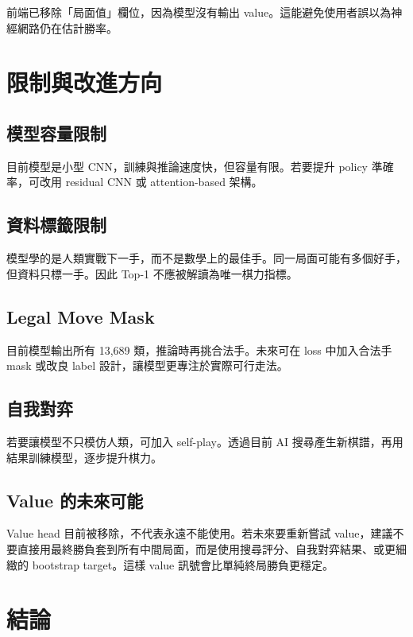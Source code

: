 \documentclass[12pt,a4paper,fontset=none]{ctexart}
\begin{document}
前端已移除「局面值」欄位，因為模型沒有輸出 value。這能避免使用者誤以為神經網路仍在估計勝率。

\section{限制與改進方向}

\subsection{模型容量限制}

目前模型是小型 CNN，訓練與推論速度快，但容量有限。若要提升 policy 準確率，可改用 residual CNN 或 attention-based 架構。

\subsection{資料標籤限制}

模型學的是人類實戰下一手，而不是數學上的最佳手。同一局面可能有多個好手，但資料只標一手。因此 Top-1 不應被解讀為唯一棋力指標。

\subsection{Legal Move Mask}

目前模型輸出所有 13,689 類，推論時再挑合法手。未來可在 loss 中加入合法手 mask 或改良 label 設計，讓模型更專注於實際可行走法。

\subsection{自我對弈}

若要讓模型不只模仿人類，可加入 self-play。透過目前 AI 搜尋產生新棋譜，再用結果訓練模型，逐步提升棋力。

\subsection{Value 的未來可能}

Value head 目前被移除，不代表永遠不能使用。若未來要重新嘗試 value，建議不要直接用最終勝負套到所有中間局面，而是使用搜尋評分、自我對弈結果、或更細緻的 bootstrap target。這樣 value 訊號會比單純終局勝負更穩定。

\section{結論}
\end{document}
